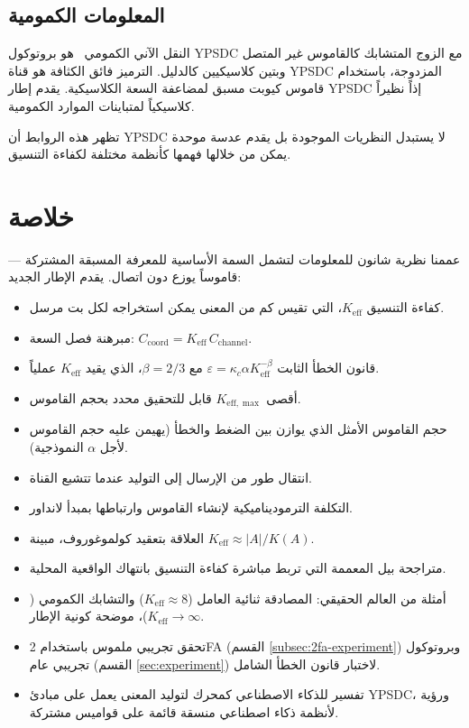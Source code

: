 \documentclass[12pt,a4paper]{article}
\newcommand{\Keff}{K_{\mathrm{eff}}}
\newcommand{\Keffmax}{K_{\mathrm{eff},\max}}
\theoremstyle{remark}
\begin{document}
	\subsection*{المعلومات الكمومية}
	النقل الآني الكمومي~\cite{Bennett1993} هو بروتوكول YPSDC مع الزوج المتشابك كالقاموس غير المتصل وبتين كلاسيكيين كالدليل. الترميز فائق الكثافة هو قناة YPSDC المزدوجة، باستخدام قاموس كيوبت مسبق لمضاعفة السعة الكلاسيكية. يقدم إطار YPSDC إذاً نظيراً كلاسيكياً لمتباينات الموارد الكمومية.
	
	تظهر هذه الروابط أن YPSDC لا يستبدل النظريات الموجودة بل يقدم عدسة موحدة يمكن من خلالها فهمها كأنظمة مختلفة لكفاءة التنسيق.
	
	\clearpage
	\section{خلاصة}
	
	عممنا نظرية شانون للمعلومات لتشمل السمة الأساسية للمعرفة المسبقة المشتركة — قاموساً يوزع دون اتصال. يقدم الإطار الجديد:
	\begin{itemize}
		\item كفاءة التنسيق \(\Keff\)، التي تقيس كم من المعنى يمكن استخراجه لكل بت مرسل.
		\item مبرهنة فصل السعة: \(C_{\text{coord}} = \Keff \, C_{\text{channel}}\).
		\item قانون الخطأ الثابت \(\varepsilon = \kappa_c\alpha K_{\mathrm{eff}}^{-\beta}\) مع \(\beta=2/3\)، الذي يقيد \(\Keff\) عملياً.
		\item أقصى \(\Keffmax\) قابل للتحقيق محدد بحجم القاموس.
		\item حجم القاموس الأمثل الذي يوازن بين الضغط والخطأ (يهيمن عليه حجم القاموس لأجل \(\alpha\) النموذجية).
		\item انتقال طور من الإرسال إلى التوليد عندما تتشبع القناة.
		\item التكلفة الترموديناميكية لإنشاء القاموس وارتباطها بمبدأ لانداور.
		\item العلاقة بتعقيد كولموغوروف، مبينة \(\Keff \approx |A|/K(A)\).
		\item متراجحة بيل المعممة التي تربط مباشرة كفاءة التنسيق بانتهاك الواقعية المحلية.
		\item أمثلة من العالم الحقيقي: المصادقة ثنائية العامل (\(\Keff \approx 8\)) والتشابك الكمومي (\(\Keff \to \infty\))، موضحة كونية الإطار.
		\item تحقق تجريبي ملموس باستخدام 2FA (القسم \ref{subsec:2fa-experiment}) وبروتوكول تجريبي عام (القسم \ref{sec:experiment}) لاختبار قانون الخطأ الشامل.
		\item تفسير للذكاء الاصطناعي كمحرك لتوليد المعنى يعمل على مبادئ YPSDC، ورؤية لأنظمة ذكاء اصطناعي منسقة قائمة على قواميس مشتركة.
	\end{itemize}
	
\end{document}
